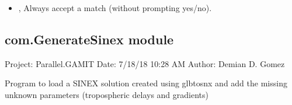 \documentclass[letterpaper,10pt,english]{sphinxmanual}
\begin{document}
\begin{itemize}
\item {} 
\sphinxAtStartPar
{\hyperref[\detokenize{com:DownloadSourcesFill.py--yes}]{}}, {\hyperref[\detokenize{com:DownloadSourcesFill.py---force_yes}]{}} \sphinxhyphen{} Always accept a match (without prompting yes/no).

\end{itemize}


\subsection{com.GenerateSinex module}
\label{\detokenize{com:module-com.GenerateSinex}}\label{\detokenize{com:com-generatesinex-module}}
\sphinxAtStartPar
Project: Parallel.GAMIT
Date: 7/18/18 10:28 AM
Author: Demian D. Gomez

\sphinxAtStartPar
Program to load a SINEX solution created using glbtosnx and add the missing unknown parameters (tropospheric delays
and gradients)

\begin{fulllineitems}
\label{\detokenize{com:com.GenerateSinex.add_domes}}
\pysigstartsignatures
{}
\pysigstopsignatures
\end{fulllineitems}


\begin{fulllineitems}
\label{\detokenize{com:com.GenerateSinex.main}}
\pysigstartsignatures
{}
\pysigstopsignatures
\end{fulllineitems}

\end{document}
